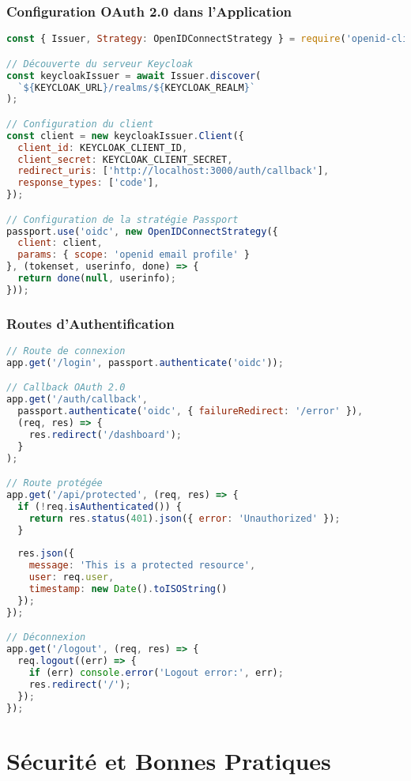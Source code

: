 \documentclass[aspectratio=169]{beamer}
\begin{document}
\begin{frame}[fragile]
    \frametitle{Configuration OAuth 2.0 dans l'Application}
    \begin{lstlisting}[language=JavaScript, caption=Configuration Passport.js]
const { Issuer, Strategy: OpenIDConnectStrategy } = require('openid-client');

// Découverte du serveur Keycloak
const keycloakIssuer = await Issuer.discover(
  `${KEYCLOAK_URL}/realms/${KEYCLOAK_REALM}`
);

// Configuration du client
const client = new keycloakIssuer.Client({
  client_id: KEYCLOAK_CLIENT_ID,
  client_secret: KEYCLOAK_CLIENT_SECRET,
  redirect_uris: ['http://localhost:3000/auth/callback'],
  response_types: ['code'],
});

// Configuration de la stratégie Passport
passport.use('oidc', new OpenIDConnectStrategy({
  client: client,
  params: { scope: 'openid email profile' }
}, (tokenset, userinfo, done) => {
  return done(null, userinfo);
}));
    \end{lstlisting}
\end{frame}

\begin{frame}[fragile]
    \frametitle{Routes d'Authentification}
    \begin{lstlisting}[language=JavaScript, caption=Routes Express.js]
// Route de connexion
app.get('/login', passport.authenticate('oidc'));

// Callback OAuth 2.0
app.get('/auth/callback', 
  passport.authenticate('oidc', { failureRedirect: '/error' }),
  (req, res) => {
    res.redirect('/dashboard');
  }
);

// Route protégée
app.get('/api/protected', (req, res) => {
  if (!req.isAuthenticated()) {
    return res.status(401).json({ error: 'Unauthorized' });
  }
  
  res.json({
    message: 'This is a protected resource',
    user: req.user,
    timestamp: new Date().toISOString()
  });
});

// Déconnexion
app.get('/logout', (req, res) => {
  req.logout((err) => {
    if (err) console.error('Logout error:', err);
    res.redirect('/');
  });
});
    \end{lstlisting}
\end{frame}

\section{Sécurité et Bonnes Pratiques}
\end{document}
